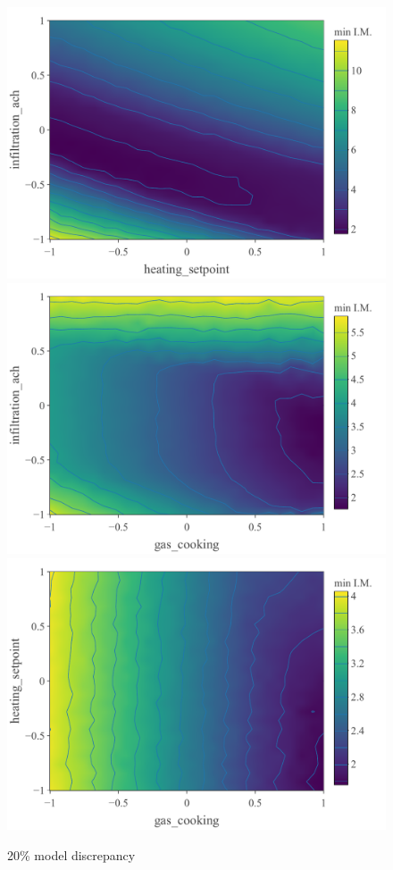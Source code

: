 \documentclass[a4paper, 12pt]{article}
\begin{document}
\begin{figure}
\centering
 \includegraphics[width=\scale]{Gas_Compatibility/Min_Impl/minImpl_MD=20_x=1_y=6}
 \includegraphics[width=\scale]{Gas_Compatibility/Min_Impl/minImpl_MD=20_x=8_y=6}\\
 \hspace{\scale}
  \includegraphics[width=\scale]{Gas_Compatibility/Min_Impl/minImpl_MD=20_x=8_y=1}
 \caption{20\% model discrepancy}
 \label{Fig_Min_Implaus_20MD}
\end{figure}
\end{document}
